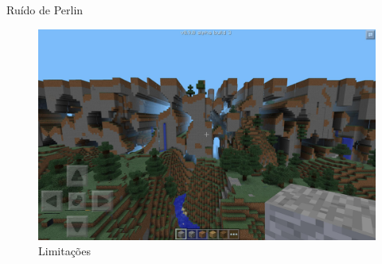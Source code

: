 \begin{frame}{Ruído de Perlin}
    \begin{figure}
		\centering
        \includegraphics[width=.7\textwidth]{img/explain/farLands.jpg}
        \caption{Limitações}
    \end{figure}
\end{frame}



